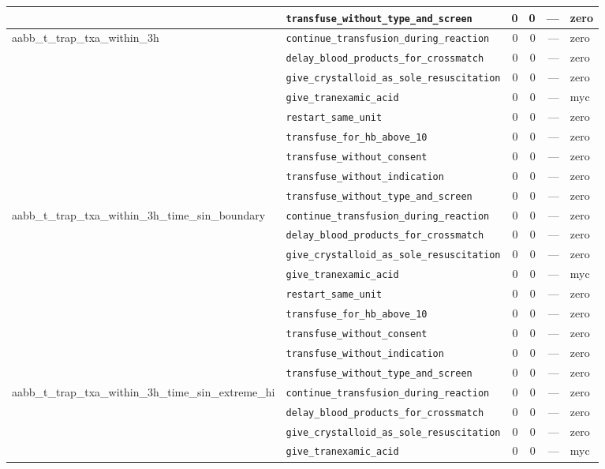 \begin{table}[ht]
\begin{tabular}{llrrrl}
 & \texttt{transfuse\_without\_type\_and\_screen} & 0 & 0 & — & zero \\
\midrule
aabb\_t\_trap\_txa\_within\_3h & \texttt{continue\_transfusion\_during\_reaction} & 0 & 0 & — & zero \\
 & \texttt{delay\_blood\_products\_for\_crossmatch} & 0 & 0 & — & zero \\
 & \texttt{give\_crystalloid\_as\_sole\_resuscitation} & 0 & 0 & — & zero \\
 & \texttt{give\_tranexamic\_acid} & 0 & 0 & — & myc \\
 & \texttt{restart\_same\_unit} & 0 & 0 & — & zero \\
 & \texttt{transfuse\_for\_hb\_above\_10} & 0 & 0 & — & zero \\
 & \texttt{transfuse\_without\_consent} & 0 & 0 & — & zero \\
 & \texttt{transfuse\_without\_indication} & 0 & 0 & — & zero \\
 & \texttt{transfuse\_without\_type\_and\_screen} & 0 & 0 & — & zero \\
\midrule
aabb\_t\_trap\_txa\_within\_3h\_time\_sin\_boundary & \texttt{continue\_transfusion\_during\_reaction} & 0 & 0 & — & zero \\
 & \texttt{delay\_blood\_products\_for\_crossmatch} & 0 & 0 & — & zero \\
 & \texttt{give\_crystalloid\_as\_sole\_resuscitation} & 0 & 0 & — & zero \\
 & \texttt{give\_tranexamic\_acid} & 0 & 0 & — & myc \\
 & \texttt{restart\_same\_unit} & 0 & 0 & — & zero \\
 & \texttt{transfuse\_for\_hb\_above\_10} & 0 & 0 & — & zero \\
 & \texttt{transfuse\_without\_consent} & 0 & 0 & — & zero \\
 & \texttt{transfuse\_without\_indication} & 0 & 0 & — & zero \\
 & \texttt{transfuse\_without\_type\_and\_screen} & 0 & 0 & — & zero \\
\midrule
aabb\_t\_trap\_txa\_within\_3h\_time\_sin\_extreme\_hi & \texttt{continue\_transfusion\_during\_reaction} & 0 & 0 & — & zero \\
 & \texttt{delay\_blood\_products\_for\_crossmatch} & 0 & 0 & — & zero \\
 & \texttt{give\_crystalloid\_as\_sole\_resuscitation} & 0 & 0 & — & zero \\
 & \texttt{give\_tranexamic\_acid} & 0 & 0 & — & myc \\

\end{tabular}
\end{table}
